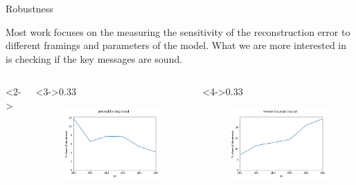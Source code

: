 \documentclass[9pt]{beamer}
\begin{document}
\begin{frame}{Robustness}

Most work focuses on the measuring the sensitivity of the reconstruction error to different framings and parameters of the model. What we are more interested in is checking if the key messages are sound.

\begin{columns}<2->
	\begin{column}<3->{0.33\linewidth}
		\begin{figure}
			\includegraphics[width=\linewidth]{../plots/aero_share}
		\end{figure}
	\end{column}
	
	\begin{column}<4->{0.33\linewidth}
		\begin{figure}
			\includegraphics[width=\linewidth]{../plots/sus_share}
		\end{figure}
	\end{column}
	

\end{columns}
\end{frame}
\end{document}
